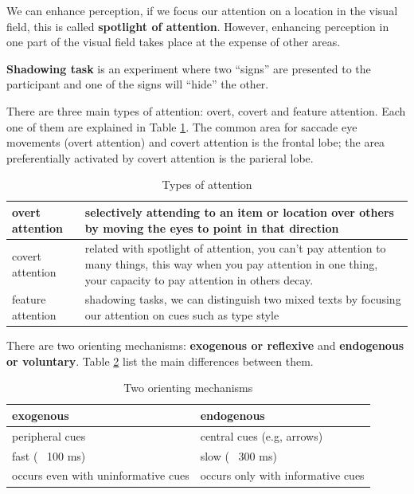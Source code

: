 \documentclass[12pt,article,oneside,a4paper]{memoir}
\begin{document}
We can enhance perception, if we focus our attention on a location in the visual
field, this is called \textbf{spotlight of attention}. However, enhancing
perception in one part of the visual field takes place at the expense of other
areas.

\textbf{Shadowing task} is an experiment where two ``signs'' are presented to
the participant and one of the signs will ``hide'' the other.

There are three main types of attention: overt, covert and feature attention.
Each one of them are explained in Table \ref{table:types-attention}. The common
area for saccade eye movements (overt attention) and covert attention is the
frontal lobe; the area preferentially activated by covert attention is the
parieral lobe.

\begin{table}
  \begin{tabular}{ p{5cm} |  p{10cm} }
    \hline
    overt attention & selectively attending to an item or location over others
    by moving the eyes to point in that direction \\ \hline
    covert attention & related with spotlight of attention, you can't pay
    attention to many things, this way when you pay attention in one thing,
    your capacity to pay attention in others decay. \\ \hline
    feature attention & shadowing tasks, we can distinguish two mixed texts by
    focusing our attention on cues such as type style \\ 
    \hline
  \end{tabular}
  \caption{Types of attention}
  \label{table:types-attention}
\end{table}

There are two orienting mechanisms: \textbf{exogenous or reflexive} and
\textbf{endogenous or voluntary}. Table \ref{table:orienting-mechanisms} list
the main differences between them.

\begin{table}
  \begin{tabular}{ p{8cm} |  p{8cm} }
    \hline
    exogenous & endogenous \\ \hline
	\hline
    peripheral cues & central cues (e.g, arrows) \\ \hline
    fast (~ 100 ms) & slow (~ 300 ms) \\ \hline 
    occurs even with uninformative cues & occurs only with informative cues \\
    \hline
  \end{tabular}
  \caption{Two orienting mechanisms}
  \label{table:orienting-mechanisms}
\end{table}
\end{document}

